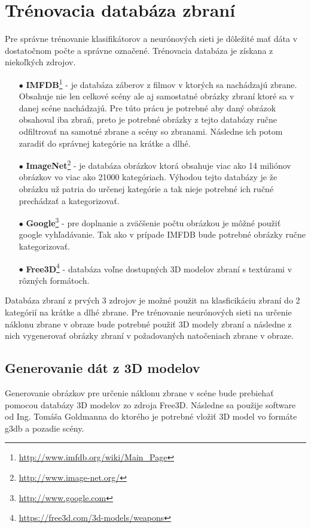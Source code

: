 
\section{Trénovacia databáza zbraní}
\label{sec:databaza}
Pre správne trénovanie klasifikátorov a neurónových sieti je dôležité mať dáta v dostatočnom počte a správne označené.
Trénovacia databáza je získana z niekoľkých zdrojov.
\begin{enumerate}
    \item[$\bullet$] \textbf{IMFDB}\footnote{\url{http://www.imfdb.org/wiki/Main_Page}} - je databáza záberov z filmov v ktorých sa nachádzajú zbrane.
    Obsahuje nie len celkové scény ale aj samostatné obrázky zbraní ktoré sa v danej scéne nachádzajú.
    Pre túto prácu je potrebné aby daný obrázok obsahoval iba zbraň, preto je potrebné obrázky z tejto databázy ručne odfiltrovať na samotné zbrane a scény so zbranami.
    Následne ich potom zaradiť do správnej kategórie na krátke a dlhé.
    \item[$\bullet$] \textbf{ImageNet}\footnote{\url{http://www.image-net.org/}} - je databáza obrázkov ktorá obsahuje viac ako 14 miliónov obrázkov vo viac ako 21000 kategóriach.
    Výhodou tejto databázy je že obrázku už patria do určenej kategórie a tak nieje potrebné ich ručné prechádzať a kategorizovať.
    \item[$\bullet$] \textbf{Google}\footnote{\url{http://www.google.com}} - pre doplnanie a zväčšenie počtu obrázkou je môžné použiť google vyhľadávanie.
    Tak ako v prípade IMFDB bude potrebné obrázky ručne kategorizovať.
    \item[$\bullet$] \textbf{Free3D}\footnote{\url{https://free3d.com/3d-models/weapons}} - databáza voľne dostupných 3D modelov zbraní s textúrami v rôzných formátoch.
\end{enumerate}

Databáza zbraní z prvých 3 zdrojov je možné použit na klasficikáciu zbraní do 2 kategórií na krátke a dlhé zbrane.
Pre trénovanie neurónových sieti na určenie náklonu zbrane v obraze bude potrebné použiť 3D modely zbraní a následne z nich vygenerovať
    obrázky zbraní v požadovaných natočeniach zbrane v obraze.

\subsection{Generovanie dát z 3D modelov}
\label{subsec:generovanie3d}
Generovanie obrázkov pre určenie náklonu zbrane v scéne bude prebiehať pomocou databázy 3D modelov zo zdroja Free3D.
Následne sa použije software od Ing. Tomáša Goldmanna do ktorého je potrebné vložiť 3D model vo formáte g3db a pozadie scény.

